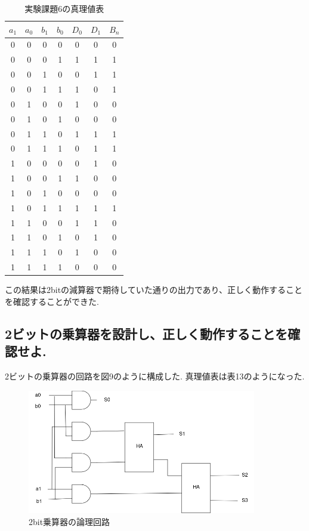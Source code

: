 \documentclass[titlepage]{jsarticle}
\theoremstyle{definition}
\begin{document}
\begin{table}[htbp]
	\caption{実験課題6の真理値表}
	\centering
	\begin{tabular}{|c|c|c|c||c|c|c|} \hline
		$a_1$ & $a_0$ & $b_1$ & $b_0$ & $D_0$ & $D_1$ & $B_n$ \\ \hline \hline
		0 & 0 & 0 & 0 & 0 & 0 & 0 \\ \hline
		0 & 0 & 0 & 1 & 1 & 1 & 1 \\ \hline
		0 & 0 & 1 & 0 & 0 & 1 & 1 \\ \hline
		0 & 0 & 1 & 1 & 1 & 0 & 1 \\ \hline
		0 & 1 & 0 & 0 & 1 & 0 & 0 \\ \hline
		0 & 1 & 0 & 1 & 0 & 0 & 0 \\ \hline
		0 & 1 & 1 & 0 & 1 & 1 & 1 \\ \hline
		0 & 1 & 1 & 1 & 0 & 1 & 1 \\ \hline
		1 & 0 & 0 & 0 & 0 & 1 & 0 \\ \hline
		1 & 0 & 0 & 1 & 1 & 0 & 0 \\ \hline
		1 & 0 & 1 & 0 & 0 & 0 & 0 \\ \hline
		1 & 0 & 1 & 1 & 1 & 1 & 1 \\ \hline
		1 & 1 & 0 & 0 & 1 & 1 & 0 \\ \hline
		1 & 1 & 0 & 1 & 0 & 1 & 0 \\ \hline
		1 & 1 & 1 & 0 & 1 & 0 & 0 \\ \hline
		1 & 1 & 1 & 1 & 0 & 0 & 0 \\ \hline
	\end{tabular}
\end{table}


この結果は2bitの減算器で期待していた通りの出力であり、正しく動作することを確認することができた.

\subsection{2ビットの乗算器を設計し、正しく動作することを確認せよ.}
2ビットの乗算器の回路を図9のように構成した.
真理値表は表13のようになった.

\begin{figure}[htbp]
	\begin{center}
		\includegraphics[width=100mm]{2bitmult.png}
		\caption{2bit乗算器の論理回路}
	\end{center}
\end{figure}
\end{document}

